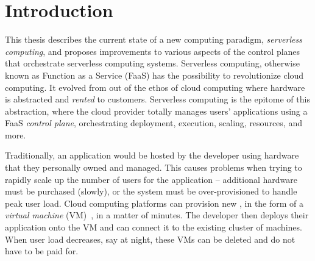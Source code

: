 \chapter{Introduction}
\label{chap:introduction}



This thesis describes the current state of a new computing paradigm, \emph{serverless computing}, and proposes improvements to various aspects of the control planes that orchestrate serverless computing systems.
Serverless computing, otherwise known as Function as a Service (FaaS) has the possibility to revolutionize cloud computing.
It evolved from out of the ethos of cloud computing where hardware is abstracted and \emph{rented} to customers.
Serverless computing is the epitome of this abstraction, where the cloud provider totally manages users' applications using a FaaS \emph{control plane}, orchestrating deployment, execution, scaling, resources, and more.

Traditionally, an application would be hosted by the developer using hardware that they personally owned and managed.
This causes problems when trying to rapidly scale up the number of users for the application -- additional hardware must be purchased (slowly), or the system must be over-provisioned to handle peak user load.
Cloud computing platforms can provision new , in the form of a \emph{virtual machine} (VM)~\cite{xen}, in a matter of minutes.
The developer then deploys their application onto the VM and can connect it to the existing cluster of machines.
When user load decreases, say at night, these VMs can be deleted and do not have to be paid for.

